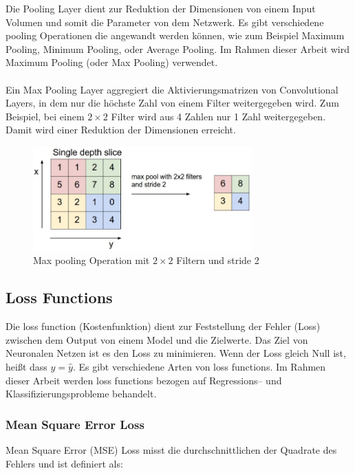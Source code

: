 Die Pooling Layer dient zur Reduktion der Dimensionen von einem Input Volumen und somit die Parameter von dem Netzwerk. Es gibt 
verschiedene pooling Operationen die angewandt werden können, wie zum Beispiel Maximum Pooling, Minimum Pooling, oder Average Pooling. Im Rahmen 
dieser Arbeit wird Maximum Pooling (oder Max Pooling) verwendet.
\\
\\
Ein Max Pooling \gls{Layer} aggregiert die Aktivierungsmatrizen von Convolutional Layers, in dem nur die höchste Zahl von einem Filter weitergegeben 
wird. Zum Beispiel, bei einem $ 2 \times 2 $ Filter wird aus 4 Zahlen nur 1 Zahl weitergegeben. Damit wird einer Reduktion der Dimensionen erreicht.

\begin{figure}[H]
  \centering
  \includegraphics[width=0.75\textwidth]{resources/cnn/pooling.png}
  \caption{
    Max pooling Operation mit $ 2 \times 2 $ Filtern und \gls{stride} 2
    \cite{convnet-demo}
  }
  \label{image:pooling}
\end{figure}

\subsection{Loss Functions}
Die \gls{loss function} (Kostenfunktion) dient zur Feststellung der Fehler (Loss) zwischen dem Output von einem Model und die Zielwerte. 
Das Ziel von Neuronalen Netzen ist es den Loss zu minimieren. Wenn der Loss gleich Null ist, heißt dass $ y = \hat{y} $. Es gibt verschiedene Arten 
von \gls{loss function}s. Im Rahmen dieser Arbeit werden \gls{loss function}s bezogen auf Regressions– und Klassifizierungsprobleme behandelt.

\subsubsection{Mean Square Error Loss}
Mean Square Error (MSE) Loss misst die durchschnittlichen der Quadrate des Fehlers und ist definiert als:

